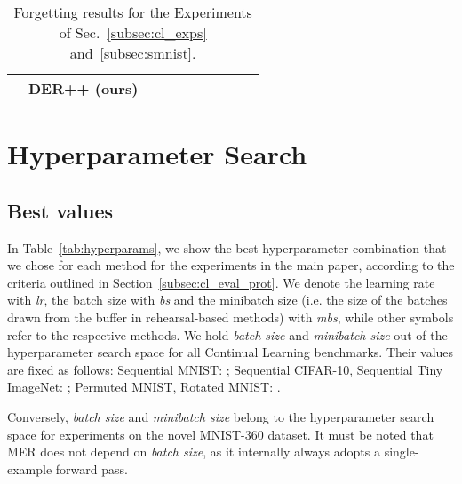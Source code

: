 \documentclass{article}
\begin{document}
\begin{table}[H]
{{\begin{tabular}{clcccccccc}
                        & \textbf{DER++ (ours)} &   \tiny{}                                  &   \tiny{}                                  &  \tiny{}                 &   \tiny{}                &  \tiny{}                     &  \tiny{} \\
\bottomrule
\end{tabular}
}
\caption{Forgetting results for the Experiments of Sec.~\ref{subsec:cl_exps} and~\ref{subsec:smnist}.}
}
\end{table} 
\section{Hyperparameter Search}
\subsection{Best values}
In Table~\ref{tab:hyperparams}, we show the best hyperparameter combination that we chose for each method for the experiments in the main paper, according to the criteria outlined in Section~\ref{subsec:cl_eval_prot}. We denote the learning rate with \textit{lr}, the batch size with \textit{bs} and the minibatch size (i.e. the size of the batches drawn from the buffer in rehearsal-based methods) with \textit{mbs}, while other symbols refer to the respective methods. We hold \textit{batch size} and \textit{minibatch size} out of the hyperparameter search space for all Continual Learning benchmarks. Their values are fixed as follows: Sequential MNIST: ; Sequential CIFAR-10, Sequential Tiny ImageNet: ; Permuted MNIST, Rotated MNIST: .

Conversely, \textit{batch size} and \textit{minibatch size} belong to the hyperparameter search space for experiments on the novel MNIST-360 dataset. It must be noted that MER does not depend on \textit{batch size}, as it internally always adopts a single-example forward pass.
\setlength\cellspacetoplimit{3.5pt}
\setlength\cellspacebottomlimit{1.5pt}
\end{document}
